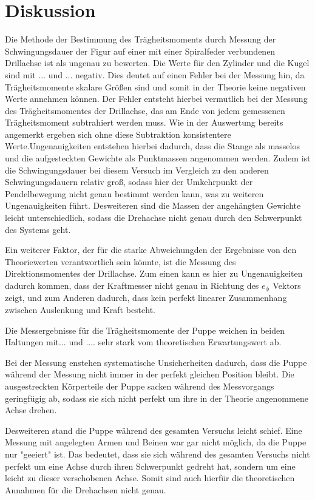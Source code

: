 \section{Diskussion}
\label{sec:Diskussion}

Die Methode der Bestimmung des Trägheitsmoments durch Messung der Schwingungsdauer
der Figur auf einer mit einer Spiralfeder verbundenen Drillachse ist als ungenau
zu bewerten.
Die Werte für den Zylinder und die Kugel sind mit ... und ... negativ. Dies
deutet auf einen Fehler bei der Messung hin, da Trägheitsmomente skalare Größen sind
und somit in der Theorie keine negativen Werte annehmen können. Der Fehler entsteht
hierbei vermutlich bei der Messung des Trägheitsmomentes der Drillachse, das am Ende
von jedem gemessenen Trägheitsmoment subtrahiert werden muss. Wie in der Auswertung
bereits angemerkt ergeben sich ohne diese Subtraktion konsistentere Werte.Ungenauigkeiten entstehen
hierbei dadurch, dass die Stange als masselos und die aufgesteckten Gewichte als
Punktmassen angenommen werden. Zudem ist die Schwingungsdauer bei diesem Versuch
im Vergleich zu den anderen Schwingungsdauern relativ groß, sodass hier der Umkehrpunkt
der Pendelbewegung nicht genau bestimmt werden kann, was zu weiteren Ungenauigkeiten führt.
Desweiteren sind die Massen der angehängten Gewichte leicht unterschiedlich, sodass
die Drehachse nicht genau durch den Schwerpunkt des Systems geht.

Ein weiterer Faktor, der für die starke Abweichungden der Ergebnisse von den
Theoriewerten verantwortlich sein könnte, ist die Messung des Direktionsmomentes
der Drillachse. Zum einen kann es hier zu Ungenauigkeiten dadurch kommen, dass der
Kraftmesser nicht genau in Richtung des $e_\mathrm{\phi}$ Vektors zeigt, und zum
Anderen dadurch, dass kein perfekt linearer Zusammenhang zwischen Auslenkung und Kraft
besteht.

Die Messergebnisse für die Trägheitsmomente der Puppe weichen in beiden Haltungen
mit... und .... sehr stark vom theoretischen Erwartungswert ab.

Bei der Messung enstehen systematische Unsicherheiten dadurch, dass die Puppe während
der Messung nicht immer in der perfekt gleichen Position bleibt. Die ausgestreckten
Körperteile der Puppe sacken während des Messvorgangs geringfügig ab, sodass sie sich
nicht perfekt um ihre in der Theorie angenommene Achse drehen.

Desweiteren stand die Puppe während des gesamten Versuchs leicht schief. Eine Messung mit
angelegten Armen und Beinen war gar nicht möglich, da die Puppe nur "geeiert" ist. Das
bedeutet, dass sie sich während des gesamten Versuchs nicht perfekt um eine Achse durch
ihren Schwerpunkt gedreht hat, sondern um eine leicht zu dieser verschobenen Achse.
Somit sind auch hierfür die theoretischen Annahmen für die Drehachsen nicht genau.

